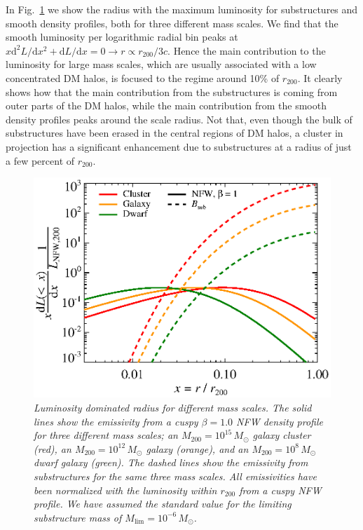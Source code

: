 \documentclass[10pt,aps,pra,reprint,amsmath,amsfonts,amssymb,showpacs]{revtex4-1}
\newcommand{\rmn}{\mathrm}
\newcommand{\msun}{M_\odot}
\newcommand{\dd}{\rmn{d}}
\newcommand{\rvir}{r_{200}}
\newcommand{\mvir}{M_{200}}
\begin{document}
In Fig.~\ref{fig:radial_emis} we show the radius with the maximum
luminosity for substructures and smooth density profiles, both for
three different mass scales. We find that the smooth luminosity per
logarithmic radial bin peaks at $x \dd^2 L/\dd x^2+\dd L/\dd x = 0
\rightarrow r \propto \rvir/3c$. Hence the main contribution to the
luminosity for large mass scales, which are usually associated with a
low concentrated DM halos, is focused to the regime around 10\% of
$\rvir$.  It clearly shows how that the main contribution from the
substructures is coming from outer parts of the DM halos, while the
main contribution from the smooth density profiles peaks around the
scale radius. Not that, even though the bulk of substructures have
been erased in the central regions of DM halos, a cluster in
projection has a significant enhancement due to substructures at a
radius of just a few percent of $\rvir$.
\begin{figure}
  \includegraphics[width=0.99\columnwidth]{figures/emissiv.sub.eps}
  \caption{\it Luminosity dominated radius for different mass
    scales. The solid lines show the emissivity from a cuspy
    $\beta=1.0$ NFW density profile for three different mass scales;
    an $\mvir=10^{15}\,\msun$ galaxy cluster (red), an
    $\mvir=10^{12}\,\msun$ galaxy (orange), and an
    $\mvir=10^{8}\,\msun$ dwarf galaxy (green). The dashed lines show
    the emissivity from substructures for the same three mass
    scales. All emissivities have been normalized with the luminosity
    within $\rvir$ from a cuspy NFW profile. We have assumed the
    standard value for the limiting substructure mass of
    $M_\rmn{lim}=10^{-6}\,\msun$.}
  \label{fig:radial_emis}
\end{figure}
\end{document}
